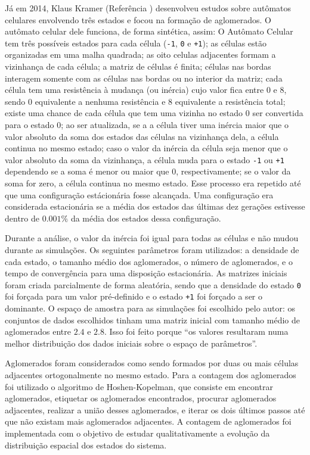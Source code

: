 \documentclass[
	12pt,				%
	openright,			%
	twoside,			%
	a4paper,			%
	english,			%
	french,				%
	spanish,			%
	brazil				%
	]{abntex2}
\begin{document}
Já em 2014, Klaus Kramer (Referência \cite{klaus}) desenvolveu estudos sobre autômatos celulares envolvendo três estados e focou na formação de aglomerados. O autômato celular dele funciona, de forma sintética, assim: O Autômato Celular tem três possíveis estados para cada célula (\texttt{-1}, \texttt{0} e \texttt{+1}); as células estão organizadas em uma malha quadrada; as oito celulas adjacentes formam a vizinhança de cada célula; a matriz de células é finita; células nas bordas interagem somente com as células nas bordas ou no interior da matriz; cada célula tem uma resistência à mudança (ou inércia) cujo valor fica entre $0$ e $8$, sendo $0$ equivalente a nenhuma resistência e $8$ equivalente a resistência total; existe uma chance de cada célula que tem uma vizinha no estado $0$ ser convertida para o estado $0$; ao ser atualizada, se a a célula tiver uma inércia maior que o valor absoluto da soma dos estados das células na vizinhança dela, a célula continua no mesmo estado; caso o valor da inércia da célula seja menor que o valor absoluto da soma da vizinhança, a célula muda para o estado \texttt{-1} ou \texttt{+1} dependendo se a soma é menor ou maior que $0$, respectivamente; se o valor da soma for zero, a célula continua no mesmo estado. Esse processo era repetido até que uma configuração estácionária fosse alcançada. Uma configuração era considerada estacionária se a média dos estados das últimas dez gerações estivesse dentro de $0.001\%$ da média dos estados dessa configuração.

Durante a análise, o valor da inércia foi igual para todas as células e não mudou durante as simulações. Os seguintes parâmetros foram utilizados: a densidade de cada estado, o tamanho médio dos aglomerados, o número de aglomerados, e o tempo de convergência para uma disposição estacionária. As matrizes iniciais foram criada parcialmente de forma aleatória, sendo que a densidade do estado \texttt{0} foi forçada para um valor pré-definido e o estado \texttt{+1} foi forçado a ser o dominante. O espaço de amostra para as simulações foi escolhido pelo autor: os conjuntos de dados escolhidos tinham uma matriz inicial com tamanho médio de aglomerados entre $2.4$ e $2.8$. Isso foi feito porque ``os valores resultaram numa melhor distribuição dos dados iniciais sobre o espaço de parâmetros''.

Aglomerados foram considerados como sendo formados por duas ou mais células adjacentes ortogonalmente no mesmo estado. 
Para a contagem dos aglomerados foi utilizado o algoritmo de Hoshen-Kopelman, que consiste em encontrar aglomerados, etiquetar os aglomerados encontrados, procurar aglomerados adjacentes, realizar a união desses aglomerados, e iterar os dois últimos passos até que não existam mais aglomerados adjacentes. A contagem de aglomerados foi implementada com o objetivo de estudar qualitativamente a evolução da distribuição espacial dos estados do sistema.
\end{document}
